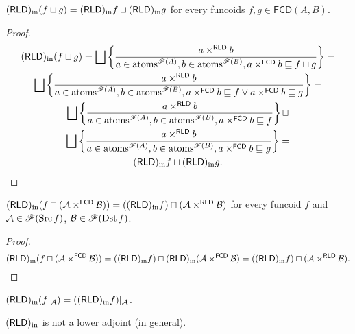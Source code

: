\begin{thm}
$(\mathsf{RLD})_{\mathrm{in}}(f\sqcup g)=(\mathsf{RLD})_{\mathrm{in}} f\sqcup(\mathsf{RLD})_{\mathrm{in}} g$ for every funcoids
$f,g\in\mathsf{FCD}(A,B)$.\end{thm}
\begin{proof}
~
\begin{multline*}
\torldin(f\sqcup g)=\bigsqcup\setcond{a\times^{\mathsf{RLD}}b}{a\in\atoms^{\mathscr{F}(A)},b\in\atoms^{\mathscr{F}(B)},a\times^{\mathsf{FCD}}b\sqsubseteq f\sqcup g}=\\
\bigsqcup\setcond{a\times^{\mathsf{RLD}}b}{a\in\atoms^{\mathscr{F}(A)},b\in\atoms^{\mathscr{F}(B)},a\times^{\mathsf{FCD}}b\sqsubseteq f\vee a\times^{\mathsf{FCD}}b\sqsubseteq g}=\\
\bigsqcup\setcond{a\times^{\mathsf{RLD}}b}{a\in\atoms^{\mathscr{F}(A)},b\in\atoms^{\mathscr{F}(B)},a\times^{\mathsf{FCD}}b\sqsubseteq f}\sqcup\\
\bigsqcup\setcond{a\times^{\mathsf{RLD}}b}{a\in\atoms^{\mathscr{F}(A)},b\in\atoms^{\mathscr{F}(B)},a\times^{\mathsf{FCD}}b\sqsubseteq g}=\\
\torldin f\sqcup\torldin g.
\end{multline*}
\end{proof}
\begin{prop}
$(\mathsf{RLD})_{\mathrm{in}}(f\sqcap(\mathcal{A}\times^{\mathsf{FCD}}\mathcal{B}))=((\mathsf{RLD})_{\mathrm{in}} f)\sqcap(\mathcal{A}\times^{\mathsf{RLD}}\mathcal{B})$
for every funcoid $f$ and $\mathcal{A}\in\mathscr{F}(\operatorname{Src} f)$, $\mathcal{B}\in\mathscr{F}(\operatorname{Dst} f)$.\end{prop}
\begin{proof}
~
\[
(\mathsf{RLD})_{\mathrm{in}}(f\sqcap(\mathcal{A}\times^{\mathsf{FCD}}\mathcal{B}))=((\mathsf{RLD})_{\mathrm{in}} f)\sqcap(\mathsf{RLD})_{\mathrm{in}}(\mathcal{A}\times^{\mathsf{FCD}}\mathcal{B})=((\mathsf{RLD})_{\mathrm{in}} f)\sqcap(\mathcal{A}\times^{\mathsf{RLD}}\mathcal{B}).
\]
\end{proof}
\begin{cor}
$(\mathsf{RLD})_{\mathrm{in}}(f|_{\mathcal{A}})=((\mathsf{RLD})_{\mathrm{in}} f)|_{\mathcal{A}}$.\end{cor}
\begin{conjecture}
$(\mathsf{RLD})_{\mathrm{in}}$ is not a lower adjoint (in general).
\end{conjecture}

